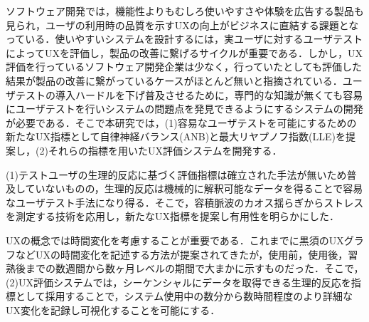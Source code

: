
\begin{jabstract}

ソフトウェア開発では，機能性よりもむしろ使いやすさや体験を広告する製品も見られ，ユーザの利用時の品質を示すUXの向上がビジネスに直結する課題となっている．使いやすいシステムを設計するには，実ユーザに対するユーザテストによってUXを評価し，製品の改善に繋げるサイクルが重要である．しかし，UX評価を行っているソフトウェア開発企業は少なく，行っていたとしても評価した結果が製品の改善に繋がっているケースがほとんど無いと指摘されている．ユーザテストの導入ハードルを下げ普及させるために，専門的な知識が無くても容易にユーザテストを行いシステムの問題点を発見できるようにするシステムの開発が必要である．そこで本研究では，(1)容易なユーザテストを可能にするための新たなUX指標として自律神経バランス(ANB)と最大リヤプノフ指数(LLE)を提案し，(2)それらの指標を用いたUX評価システムを開発する．

(1)テストユーザの生理的反応に基づく評価指標は確立された手法が無いため普及していないものの，生理的反応は機械的に解釈可能なデータを得ることで容易なユーザテスト手法になり得る．そこで，容積脈波のカオス揺らぎからストレスを測定する技術を応用し，新たなUX指標を提案し有用性を明らかにした．

UXの概念では時間変化を考慮することが重要である．これまでに黒須のUXグラフなどUXの時間変化を記述する方法が提案されてきたが，使用前，使用後，習熟後までの数週間から数ヶ月レベルの期間で大まかに示すものだった．そこで，(2)UX評価システムでは，シーケンシャルにデータを取得できる生理的反応を指標として採用することで，システム使用中の数分から数時間程度のより詳細なUX変化を記録し可視化することを可能にする．

\end{jabstract}


